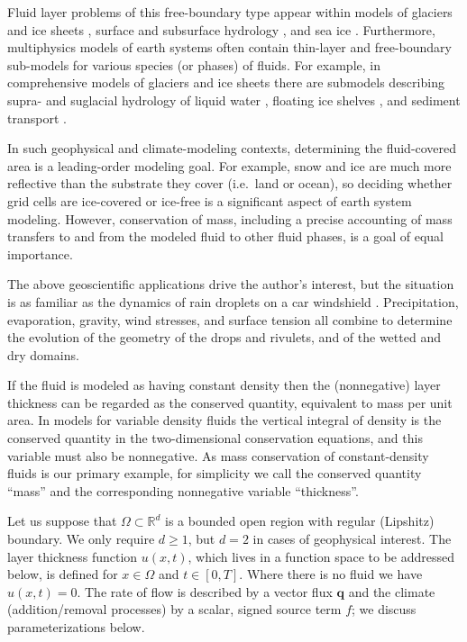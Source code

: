 \documentclass[final,onefignum]{siamart190516}
\newcommand\bq{\mathbf{q}}
\newcommand\RR{\mathbb{R}}
\begin{document}
Fluid layer problems of this free-boundary type appear within models of glaciers and ice sheets \cite{Bueler2016,CalvoDuranyVazquez2000,DiazSchiavi1999,
EgholmNielsen2010,JouvetBueler2012,JouvetBuelerGraeserKornhuber2013}, surface and subsurface hydrology \cite{AlonsoSantillanaDawson2008,Maxwelletal2015}, and sea ice \cite{LipscombHunke2004,Thorndikeetal1975}.  Furthermore, multiphysics models of earth systems often contain thin-layer and free-boundary sub-models for various species (or phases) of fluids.  For example, in comprehensive models of glaciers and ice sheets there are submodels describing supra- and suglacial hydrology of liquid water \cite{Aschwandenetal2012,BuelervanPelt2015,Schoofetal2012}, floating ice shelves \cite{Albrechtetal2011}, and sediment transport \cite{Brinkerhoffetal2017}.

In such geophysical and climate-modeling contexts, determining the fluid-covered area is a leading-order modeling goal.  For example, snow and ice are much more reflective than the substrate they cover (i.e.~land or ocean), so deciding whether grid cells are ice-covered or ice-free is a significant aspect of earth system modeling.  However, conservation of mass, including a precise accounting of mass transfers to and from the modeled fluid to other fluid phases, is a goal of equal importance.

The above geoscientific applications drive the author's interest, but the situation is as familiar as the dynamics of rain droplets on a car windshield \cite{Kondic2003}.  Precipitation, evaporation, gravity, wind stresses, and surface tension all combine to determine the evolution of the geometry of the drops and rivulets, and of the wetted and dry domains.

If the fluid is modeled as having constant density then the (nonnegative) layer thickness can be regarded as the conserved quantity, equivalent to mass per unit area.  In models for variable density fluids the vertical integral of density is the conserved quantity in the two-dimensional conservation equations, and this variable must also be nonnegative.  As mass conservation of constant-density fluids is our primary example, for simplicity we call the conserved quantity ``mass'' and the corresponding nonnegative variable ``thickness''.

Let us suppose that $\Omega \subset \RR^d$ is a bounded open region with regular (Lipshitz) boundary.  We only require $d\ge 1$, but $d=2$ in cases of geophysical interest.  The layer thickness function $u(x,t)$, which lives in a function space to be addressed below, is defined for $x\in \Omega$ and $t \in [0,T]$.  Where there is no fluid we have $u(x,t)=0$.  The rate of flow is described by a vector flux $\bq$ and the climate (addition/removal processes) by a scalar, signed source term $f$; we discuss parameterizations below.
\end{document}
